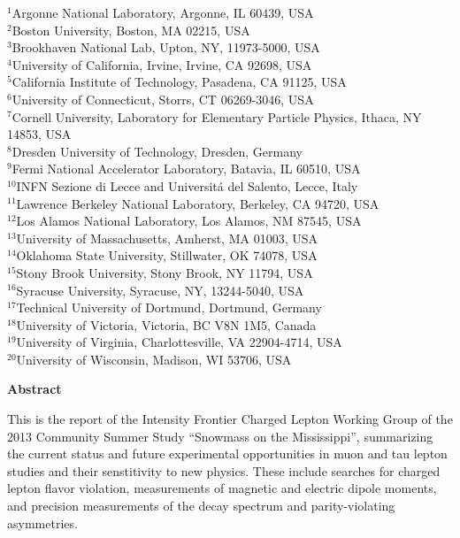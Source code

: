 \begin{center}

$^{1}$Argonne National Laboratory, Argonne, IL 60439, USA\\
$^{2}$Boston University, Boston, MA 02215, USA\\
$^{3}$Brookhaven National Lab, Upton, NY, 11973-5000, USA\\
$^{4}$University of California, Irvine, Irvine, CA 92698, USA\\
$^{5}$California Institute of Technology, Pasadena, CA 91125, USA\\
$^{6}$University of Connecticut, Storrs, CT 06269-3046, USA\\
$^{7}$Cornell University, Laboratory for Elementary Particle Physics, Ithaca, NY 14853, USA\\
$^{8}$Dresden University of Technology, Dresden, Germany\\
$^{9}$Fermi National Accelerator Laboratory, Batavia, IL 60510, USA\\
$^{10}$INFN Sezione di Lecce and Universit\'a del Salento, Lecce, Italy\\
$^{11}$Lawrence Berkeley National Laboratory, Berkeley, CA 94720, USA\\
$^{12}$Los Alamos National Laboratory, Los Alamos, NM 87545, USA\\
$^{13}$University of Massachusetts, Amherst, MA 01003, USA\\
$^{14}$Oklahoma State University, Stillwater, OK 74078, USA\\
$^{15}$Stony Brook University, Stony Brook, NY 11794, USA\\
$^{16}$Syracuse University, Syracuse, NY, 13244-5040, USA\\
$^{17}$Technical University of Dortmund, Dortmund, Germany\\
$^{18}$University of Victoria, Victoria, BC V8N 1M5, Canada\\
$^{19}$University of Virginia, Charlottesville, VA 22904-4714, USA\\
$^{20}$University of Wisconsin, Madison, WI 53706, USA\\

\end{center}

\begin{center}
{\large\bf Abstract}

\parbox{\linewidth}{
This is the report of the Intensity Frontier Charged Lepton Working Group of the 2013 Community Summer Study ``Snowmass on the Mississippi'', summarizing the current status and future experimental opportunities in muon and tau lepton studies and their senstitivity to new physics. These include searches for charged lepton flavor violation, measurements of magnetic and electric dipole moments, and precision measurements of the decay spectrum and parity-violating asymmetries.}

\end{center}



